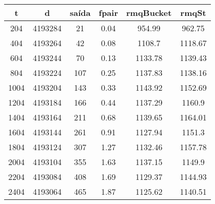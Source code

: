 \begin{tabular}{|c|c|c|c|c|c|}
\hline
\textbf{t} & \textbf{d} & \textbf{saída} & \textbf{fpair} & \textbf{rmqBucket} & \textbf{rmqSt}\\
\hline
204 & 4193284 & 21 & 0.04 & 954.99 & 962.75\\
\hline
404 & 4193264 & 42 & 0.08 & 1108.7 & 1118.67\\
\hline
604 & 4193244 & 70 & 0.13 & 1133.78 & 1139.43\\
\hline
804 & 4193224 & 107 & 0.25 & 1137.83 & 1138.16\\
\hline
1004 & 4193204 & 143 & 0.33 & 1143.92 & 1152.69\\
\hline
1204 & 4193184 & 166 & 0.44 & 1137.29 & 1160.9\\
\hline
1404 & 4193164 & 211 & 0.68 & 1139.65 & 1164.01\\
\hline
1604 & 4193144 & 261 & 0.91 & 1127.94 & 1151.3\\
\hline
1804 & 4193124 & 307 & 1.27 & 1132.46 & 1157.78\\
\hline
2004 & 4193104 & 355 & 1.63 & 1137.15 & 1149.9\\
\hline
2204 & 4193084 & 408 & 1.69 & 1129.37 & 1144.93\\
\hline
2404 & 4193064 & 465 & 1.87 & 1125.62 & 1140.51\\
\hline
\end{tabular}
